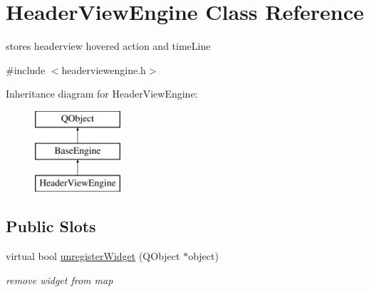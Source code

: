 \hypertarget{class_header_view_engine}{}\section{Header\+View\+Engine Class Reference}
\label{class_header_view_engine}


stores headerview hovered action and time\+Line  




{\ttfamily \#include $<$headerviewengine.\+h$>$}

Inheritance diagram for Header\+View\+Engine\+:\begin{figure}[H]
\begin{center}
\leavevmode
\includegraphics[height=3.000000cm]{class_header_view_engine}
\end{center}
\end{figure}
\subsection*{Public Slots}
\begin{DoxyCompactItemize}
\item 
\mbox{\label{class_header_view_engine_a4f23235de4a7363a06ed7ea3cd255e5f}} 
virtual bool \hyperlink{class_header_view_engine_a4f23235de4a7363a06ed7ea3cd255e5f}{unregister\+Widget} (Q\+Object $\ast$object)
\begin{DoxyCompactList}\small\item\em remove widget from map \end{DoxyCompactList}\end{DoxyCompactItemize}

